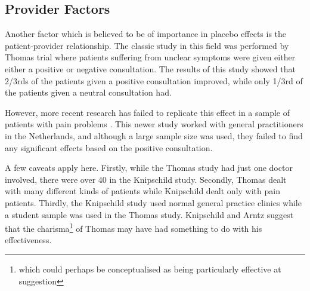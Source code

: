 

\subsection{Provider Factors}

Another factor which is believed to be of importance in placebo effects is the patient-provider relationship. The classic study in this field was performed by Thomas \cite{Thomas1994}  trial where  patients suffering from unclear symptoms were given either either a positive or negative consultation.  The results of this study showed that 2/3rds of the patients given a positive consultation improved, while only 1/3rd of the patients given a neutral consultation had. 

However, more recent research has failed to replicate this effect in a sample of patients with pain problems \cite{Knipschild2005}. This newer study worked with general practitioners in the Netherlands, and although a large sample size was used, they failed to find any significant effects based on the positive consultation. 

A few caveats apply here. Firstly, while the Thomas study had just one doctor involved, there were over 40 in the Knipschild study. Secondly, Thomas dealt with many different kinds of patients while Knipschild dealt only with pain patients. Thirdly, the Knipschild study used normal general practice clinics while a student sample was used in the Thomas study. Knipschild and Arntz suggest that the charisma\footnote{which could perhaps be conceptualised as being particularly effective at suggestion} of Thomas may have had something to do with his effectiveness. 

